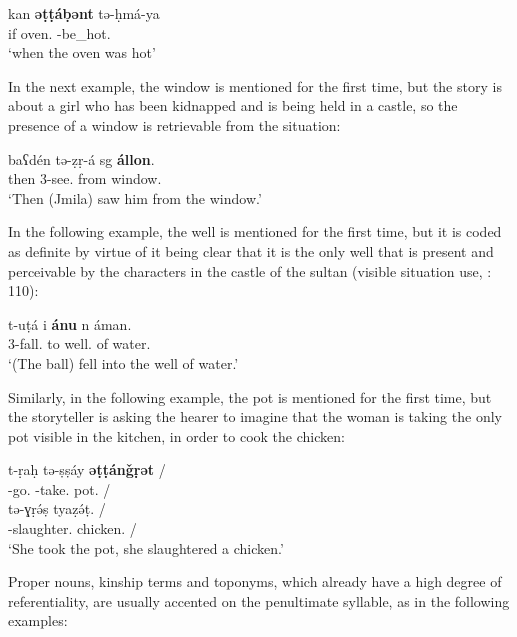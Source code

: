 \documentclass[output=paper]{langsci/langscibook}
\begin{document}
\begin{exe}
\ex\label{5ex:18}
\gll	kan	{\bf{əṭṭáḅənt}}	tə-ḥmá-ya \\
	if	oven.{}	{}-be\_hot.{} \\
\glt	`when the oven was hot'
\end{exe}

In the next example, the window is mentioned for the first time, but the story is about a girl who has been kidnapped and is being held in a castle, so the presence of a window is retrievable from the situation:

\begin{exe}
\ex\label{5ex:19}
\gll	baʕdén tə-ẓṛ-á sg {\bf{állon}}. \\
	then 3{}-see.{} from window.{} \\
\glt	`Then (Jmila) saw him from the window.'
\end{exe}

In the following example, the well is mentioned for the first time, but it is coded as definite by virtue of it being clear that it is the only well that is present and perceivable by the characters in the castle of the sultan (visible situation use, \citealt{hawkins:78}: 110):

\begin{exe}
\ex\label{5ex:20}
\gll	t-uṭá	i	{\bf{ánu}}	n	áman. \\
	3{}-fall.{}	to	well.{}	of	water.{} \\
\glt	`(The ball) fell into the well of water.'
\end{exe}

Similarly, in the following example, the pot is mentioned for the first time, but the storyteller is asking the hearer to imagine that the woman is taking the only pot visible in the kitchen, in order to cook the chicken:

\begin{exe}
\ex\label{5ex:21}
\gll	t-ṛaḥ	tə-ṣṣáy	{\bf{əṭṭánǧṛət}}	/ \\
	{}-go.{}	{}-take.{}	pot.{}	/ \\
\glt
\exi{}
\gll	tə-ɣṛə́ṣ	tyaẓə́ṭ.	/ \\
	{}-slaughter.{}	chicken.{}	/ \\
\glt	`She took the pot, she slaughtered a chicken.'
\end{exe}

Proper nouns, kinship terms and toponyms, which already have a high degree of referentiality, are usually accented on the penultimate syllable, as in the following examples:
\end{document}
